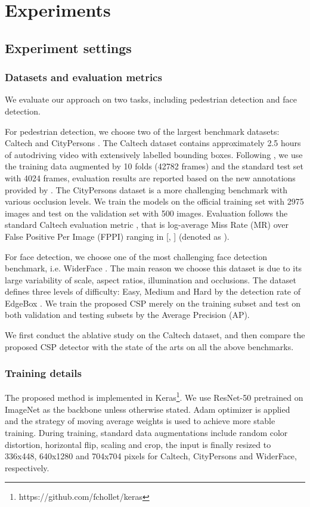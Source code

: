 \documentclass[review]{elsarticle}
\begin{document}
\section{Experiments}
\subsection{Experiment settings}
\subsubsection{Datasets and evaluation metrics}
We evaluate our approach on two tasks, including pedestrian detection and face detection.

For pedestrian detection, we choose two of the largest benchmark datasets: Caltech \cite{dollar2012pedestrian} and CityPersons \cite{zhang2017citypersons}.
The Caltech dataset contains approximately 2.5 hours of autodriving video with extensively labelled bounding boxes. Following \cite{zhang2017citypersons,mao2017can,wang2017repulsion,Liu_2018_ECCV,Zhang_2018_ECCV}, we use the training data augmented by 10 folds (42782 frames) and the standard test set with 4024 frames, evaluation results are reported based on the new annotations provided by \cite{zhang2016far}.
The CityPersons dataset is a more challenging benchmark with various occlusion levels. We train the models on the official training set with 2975 images and test on the validation set with 500 images.
Evaluation follows the standard Caltech evaluation metric \cite{dollar2012pedestrian}, that is log-average Miss Rate (MR) over False Positive Per Image (FPPI) ranging in [, ] (denoted as ).

For face detection, we choose one of the most challenging face detection benchmark, i.e. WiderFace \cite{yang2016wider}. The main reason we choose this dataset is due to its large variability of scale, aspect ratios, illumination and occlusions. The dataset defines three levels of difficulty: Easy, Medium and Hard by the detection rate of EdgeBox \cite{zitnick2014edge}. We train the proposed CSP merely on the training subset and test on both validation and testing subsets by the Average Precision (AP).

We first conduct the ablative study on the Caltech dataset, and then compare the proposed CSP detector with the state of the arts on all the above benchmarks.


\subsubsection{Training details}
The proposed method is implemented in Keras\footnote{https://github.com/fchollet/keras}.
We use ResNet-50 \cite{he2016deep} pretrained on ImageNet \cite{deng2009imagenet} as the backbone unless otherwise stated. Adam \cite{kingma2014adam} optimizer is applied and the strategy of moving average weights \cite{tarvainen2017mean} is used to achieve more stable training.
During training, standard data augmentations include random color distortion, horizontal flip, scaling and crop, the input is finally resized to 336x448, 640x1280 and 704x704 pixels for Caltech, CityPersons and WiderFace, respectively.
\end{document}
